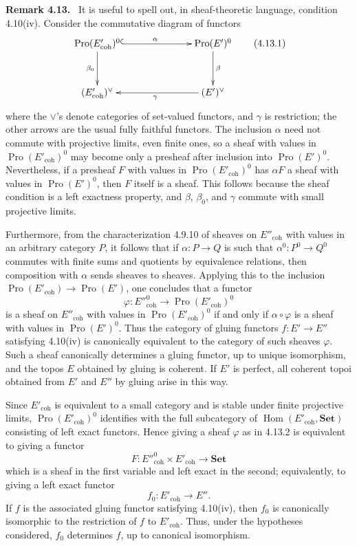 \documentclass[11pt]{article}
\newcommand{\Ens}{\mathbf{Set}}
\newcommand{\Hom}{\operatorname{Hom}}
\newcommand{\Pro}{\operatorname{Pro}}
\newcommand{\coh}{\mathrm{coh}}
\newenvironment{remarktext}[1]{\par\medskip\noindent\textbf{#1.}\ }{\par\medskip}
\begin{document}
\begin{remarktext}{Remark 4.13}
It is useful to spell out, in sheaf-theoretic language, condition 4.10(iv). Consider the commutative diagram of functors
\[
\xymatrix@C=2.5cm@R=1.2cm{
 \Pro(E'_{\coh})^0\ar@{^{(}->}[r]^{\alpha}\ar[d]_{\beta_0}&\Pro(E')^0\ar[d]^{\beta}\\
 (E'_{\coh})^\vee & (E')^\vee\ar[l]^{\gamma}
}
\tag{4.13.1}
\]
where the \(\vee\)'s denote categories of set-valued functors, and \(\gamma\) is restriction; the other arrows are the usual fully faithful functors. The inclusion \(\alpha\) need not commute with projective limits, even finite ones, so a sheaf with values in \(\Pro(E'_{\coh})^0\) may become only a presheaf after inclusion into \(\Pro(E')^0\). Nevertheless, if a presheaf \(F\) with values in \(\Pro(E'_{\coh})^0\) has \(\alpha F\) a sheaf with values in \(\Pro(E')^0\), then \(F\) itself is a sheaf. This follows because the sheaf condition is a left exactness property, and \(\beta\), \(\beta_0\), and \(\gamma\) commute with small projective limits.
\end{remarktext}

Furthermore, from the characterization 4.9.10 of sheaves on \(E''_{\coh}\) with values in an arbitrary category \(P\), it follows that if \(\alpha:P\to Q\) is such that \(\alpha^0:P^0\to Q^0\) commutes with finite sums and quotients by equivalence relations, then composition with \(\alpha\) sends sheaves to sheaves. Applying this to the inclusion \(\Pro(E'_{\coh})\to\Pro(E')\), one concludes that a functor
\[
 \varphi:{E''}_{\coh}^0\to\Pro(E'_{\coh})^0 \tag{4.13.2}
\]
is a sheaf on \(E''_{\coh}\) with values in \(\Pro(E'_{\coh})^0\) if and only if \(\alpha\circ\varphi\) is a sheaf with values in \(\Pro(E')^0\). Thus the category of gluing functors \(f:E'\to E''\) satisfying 4.10(iv) is canonically equivalent to the category of such sheaves \(\varphi\). Such a sheaf canonically determines a gluing functor, up to unique isomorphism, and the topos \(E\) obtained by gluing is coherent. If \(E'\) is perfect, all coherent topoi obtained from \(E'\) and \(E''\) by gluing arise in this way.

Since \(E'_{\coh}\) is equivalent to a small category and is stable under finite projective limits, \(\Pro(E'_{\coh})^0\) identifies with the full subcategory of \(\Hom(E'_{\coh},\Ens)\) consisting of left exact functors. Hence giving a sheaf \(\varphi\) as in 4.13.2 is equivalent to giving a functor
\[
 F:{E''}_{\coh}^0\times E'_{\coh}\to\Ens \tag{4.13.3}
\]
which is a sheaf in the first variable and left exact in the second; equivalently, to giving a left exact functor
\[
 f_0:E'_{\coh}\to E''. \tag{4.13.4}
\]
If \(f\) is the associated gluing functor satisfying 4.10(iv), then \(f_0\) is canonically isomorphic to the restriction of \(f\) to \(E'_{\coh}\). Thus, under the hypotheses considered, \(f_0\) determines \(f\), up to canonical isomorphism.
\end{document}

